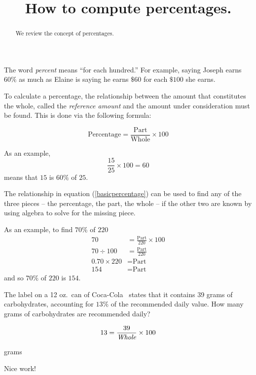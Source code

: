\documentclass{ximera}
\title{How to compute percentages.}
\begin{document}
\begin{abstract}
We review the concept of percentages.
\end{abstract}
\maketitle


The word \emph{percent} means ``for each hundred.'' For example, saying Joseph earns $60\%$ as much as Elaine is saying he earns $\$60$ for each $\$100$ she earns.

To calculate a percentage, the relationship between the amount that constitutes the whole, called the \emph{reference amount} and the amount under consideration must be found. This is done via the following formula:

\begin{equation}\label{basicpercentage}
\text{Percentage}=\frac{\text{Part}}{\text{Whole}}\times 100
\end{equation}

As an example,
\begin{equation*}
\frac{15}{25}\times 100=60
\end{equation*}
means that $15$ is $60\%$ of $25$.

The relationship in equation (\ref{basicpercentage}) can be used to find any of the three pieces -- the percentage, the part, the whole -- if the other two are known by using algebra to solve for the missing piece.

As an example, to find $70\%$ of $220$
\begin{align*}
70&=\frac{\text{Part}}{220}\times 100\\
70\div 100 &=\frac{\text{Part}}{220}\\
0.70\times 220 &=\text{Part}\\
154&=\text{Part}
\end{align*}
and so $70\%$ of $220$ is $154$.

\newcommand\customfont[1]{{ #1 }}

\begin{question}
The label on a 12 oz.\ can of \customfont{Coca-Cola}\ states that it contains 39 grams of carbohydrates, accounting for $13\%$ of the recommended daily value. How many grams of carbohydrates are recommended daily?

\begin{solution}
\begin{hint}
\begin{equation*}13=\frac{39}{\emph{\text{Whole}}}\times 100\end{equation*}
\end{hint}
 grams

\begin{comment}
\begin{expression-answer}
function validator(p) {
    if (p == 300)
      return 1;
    if (p <> 300)
      return 0;
  }
\end{expression-answer}
\end{comment}
\end{solution}

Nice work!
\end{question}
\end{document}
